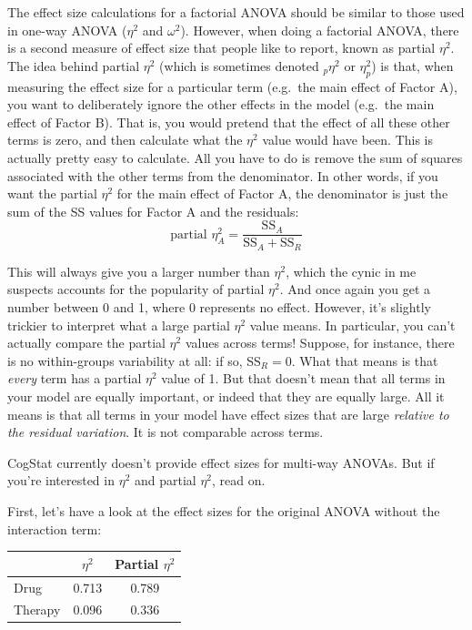 \documentclass[
  11pt,
  a4paper,
  twoside,symmetric,openright]{book}
\theoremstyle{break}
\theoremstyle{break}
\begin{document}
The effect size calculations for a factorial ANOVA should be similar to those used in one-way ANOVA (\(\eta^2\) and \(\omega^2\)). However, when doing a factorial ANOVA, there is a second measure of effect size that people like to report, known as partial \(\eta^2\). The idea behind partial \(\eta^2\) (which is sometimes denoted \(_p\eta^2\) or \(\eta^2_p\)) is that, when measuring the effect size for a particular term (e.g.~the main effect of Factor A), you want to deliberately ignore the other effects in the model (e.g.~the main effect of Factor B). That is, you would pretend that the effect of all these other terms is zero, and then calculate what the \(\eta^2\) value would have been. This is actually pretty easy to calculate. All you have to do is remove the sum of squares associated with the other terms from the denominator. In other words, if you want the partial \(\eta^2\) for the main effect of Factor A, the denominator is just the sum of the SS values for Factor A and the residuals:
\[
\mbox{partial } \eta^2_A = \frac{\mbox{SS}_{A}}{\mbox{SS}_{A} + \mbox{SS}_{R}}
\]

This will always give you a larger number than \(\eta^2\), which the cynic in me suspects accounts for the popularity of partial \(\eta^2\). And once again you get a number between 0 and 1, where 0 represents no effect. However, it's slightly trickier to interpret what a large partial \(\eta^2\) value means. In particular, you can't actually compare the partial \(\eta^2\) values across terms! Suppose, for instance, there is no within-groups variability at all: if so, SS\(_R = 0\). What that means is that \emph{every} term has a partial \(\eta^2\) value of 1. But that doesn't mean that all terms in your model are equally important, or indeed that they are equally large. All it means is that all terms in your model have effect sizes that are large \emph{relative to the residual variation}. It is not comparable across terms.

CogStat currently doesn't provide effect sizes for multi-way ANOVAs. But if you're interested in \(\eta^2\) and partial \(\eta^2\), read on.

First, let's have a look at the effect sizes for the original ANOVA without the interaction term:

\begin{longtable}[]{@{}lcc@{}}
\toprule\noalign{}
& \(\eta^2\) & Partial \(\eta^2\) \\
\midrule\noalign{}
\endhead
\bottomrule\noalign{}
\endlastfoot
Drug & 0.713 & 0.789 \\
Therapy & 0.096 & 0.336 \\
\end{longtable}
\end{document}
